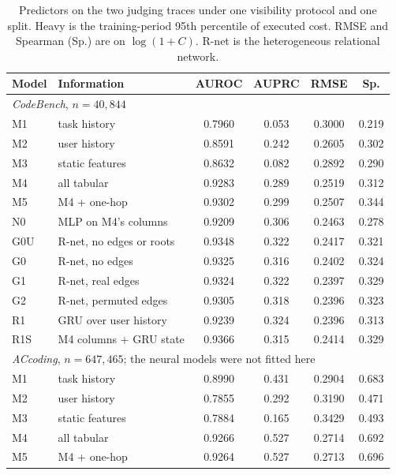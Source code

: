 \documentclass[mathematics,supfile,submit,moreauthors]{Definitions/mdpi}
\newcommand{\devnum}[1]{#1}
\begin{document}
\begin{table}[htbp]
\centering
\caption{Predictors on the two judging traces under one visibility protocol and one split.
Heavy is the training-period 95th percentile of executed cost. RMSE and Spearman (Sp.) are
on $\log(1+C)$. R-net is the heterogeneous relational network.}
\label{tab:s_pred_edu}
\small
\begin{tabular}{llcccc}
\hline
Model & Information & AUROC & AUPRC & RMSE & Sp. \\
\hline
\multicolumn{6}{l}{\textit{CodeBench}, $n = \devnum{40{,}844}$} \\
M1  & task history            & \devnum{0.7960} & \devnum{0.053} & \devnum{0.3000} & \devnum{0.219} \\
M2  & user history            & \devnum{0.8591} & \devnum{0.242} & \devnum{0.2605} & \devnum{0.302} \\
M3  & static features         & \devnum{0.8632} & \devnum{0.082} & \devnum{0.2892} & \devnum{0.290} \\
M4  & all tabular             & \devnum{0.9283} & \devnum{0.289} & \devnum{0.2519} & \devnum{0.312} \\
M5  & M4 + one-hop            & \devnum{0.9302} & \devnum{0.299} & \devnum{0.2507} & \devnum{0.344} \\
N0  & MLP on M4's columns     & \devnum{0.9209} & \devnum{0.306} & \devnum{0.2463} & \devnum{0.278} \\
G0U & R-net, no edges or roots & \devnum{0.9348} & \devnum{0.322} & \devnum{0.2417} & \devnum{0.321} \\
G0  & R-net, no edges         & \devnum{0.9325} & \devnum{0.316} & \devnum{0.2402} & \devnum{0.324} \\
G1  & R-net, real edges       & \devnum{0.9324} & \devnum{0.322} & \devnum{0.2397} & \devnum{0.329} \\
G2  & R-net, permuted edges   & \devnum{0.9305} & \devnum{0.318} & \devnum{0.2396} & \devnum{0.323} \\
R1  & GRU over user history   & \devnum{0.9239} & \devnum{0.324} & \devnum{0.2396} & \devnum{0.313} \\
R1S & M4 columns + GRU state  & \devnum{0.9366} & \devnum{0.315} & \devnum{0.2414} & \devnum{0.329} \\
\hline
\multicolumn{6}{l}{\textit{ACcoding}, $n = \devnum{647{,}465}$; the neural models were not fitted here} \\
M1  & task history            & \devnum{0.8990} & \devnum{0.431} & \devnum{0.2904} & \devnum{0.683} \\
M2  & user history            & \devnum{0.7855} & \devnum{0.292} & \devnum{0.3190} & \devnum{0.471} \\
M3  & static features         & \devnum{0.7884} & \devnum{0.165} & \devnum{0.3429} & \devnum{0.493} \\
M4  & all tabular             & \devnum{0.9266} & \devnum{0.527} & \devnum{0.2714} & \devnum{0.692} \\
M5  & M4 + one-hop            & \devnum{0.9264} & \devnum{0.527} & \devnum{0.2713} & \devnum{0.696} \\
\hline
\end{tabular}
\end{table}
\end{document}
